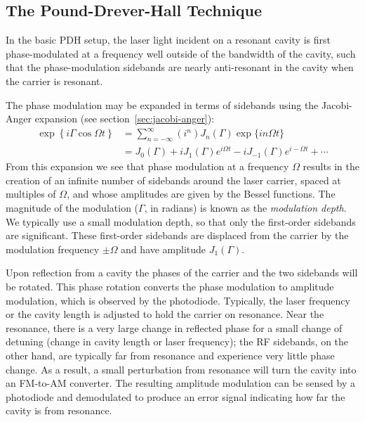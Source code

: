 \subsection{The Pound-Drever-Hall Technique}
In the basic PDH setup, the laser light incident on a resonant cavity
is first phase-modulated at a frequency well outside of the bandwidth
of the cavity, such that the phase-modulation sidebands are nearly
anti-resonant in the cavity when the carrier is resonant.

The phase modulation may be expanded in terms of sidebands using the
Jacobi-Anger expansion (see section~\ref{sec:jacobi-anger}):
%
\begin{align}
\exp\left\{i\Gamma\cos\Omega t\right\} 
  &= \sum_{n=-\infty}^{\infty} \left(i^n\right)  J_n(\Gamma) \exp\{i n \Omega t\} \\
  &= J_0(\Gamma) + i J_{1}(\Gamma) e^{i\Omega t} - i J_{-1}(\Gamma) e^{i -\Omega t}+\cdots %
\end{align}
From this expansion we see that phase modulation at a frequency
$\Omega$ results in the creation of an infinite number of sidebands
around the laser carrier, spaced at multiples of $\Omega$, and whose
amplitudes are given by the Bessel functions.  The magnitude of the
modulation ($\Gamma$, in radians) is known as the \emph{modulation
depth}.  We typically use a small modulation depth, so that only the
first-order sidebands are significant.  These first-order sidebands
are displaced from the carrier by the modulation frequency $\pm\Omega$
and have amplitude $J_1(\Gamma)$.

Upon reflection from a cavity the phases of the carrier and the two
sidebands will be rotated.  This phase rotation converts the phase
modulation to amplitude modulation, which is observed by the
photodiode.  Typically, the laser frequency or the cavity length is
adjusted to hold the carrier on resonance.  Near the resonance, there
is a very large change in reflected phase for a small change of
detuning (change in cavity length or laser frequency); the RF
sidebands, on the other hand, are typically far from resonance and
experience very little phase change.  As a result, a small perturbation
from resonance will turn the cavity into an FM-to-AM converter.  The
resulting amplitude modulation can be sensed by a photodiode and
demodulated to produce an error signal indicating how far the cavity
is from resonance.

